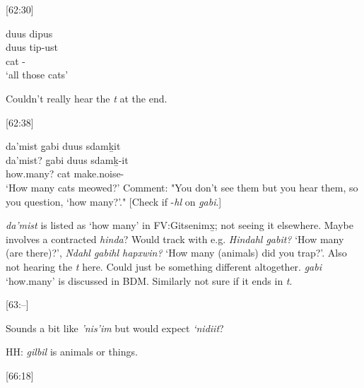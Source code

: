 \documentclass{article}
\begin{document}
[62:30] \begin{exe}
    \ex \glll
    duus dipus \\
    duus tip-ust \\
    cat \Dem-\Dist \\
    \glt `all those cats'
\end{exe}

Couldn't really hear the \textit{t} at the end.

[62:38] \begin{exe}
    \ex \glll
    da'mist g̱abi duus sdamḵit  \\
    da'mist? g̱abi duus sdamḵ-it \\ 
    how.many? \Cnt{} cat make.noise-\Sx \\
    \glt `How many cats meowed?' Comment: "You don't see them but you hear them, so you question, `how many?'." [Check if -\textit{hl} on \textit{g̱abi}.]
\end{exe}

\textit{da’mist} is listed as `how many' in FV:Gitsenimx̱; not seeing it elsewhere. Maybe involves a contracted \textit{hinda}? Would track with e.g. \textit{Hindahl g̱abit?} `How many (are there)?', \textit{Ndahl g̱abihl hapxwin?} `How many (animals) did you trap?'. Also not hearing the \textit{t} here. Could just be something different altogether. \textit{g̱abi} `how.many' is discussed in BDM. Similarly not sure if it ends in \textit{t}.

[63:--]

\begin{exe}
\end{exe}

\begin{exe}
\end{exe}

Sounds a bit like \textit{'nis'im} but would expect \textit{‘nidiit}?

HH: \textit{gilbil} is animals or things.

[66:18]
\begin{exe}
\end{exe}

\begin{exe}
\end{exe}
\end{document}
